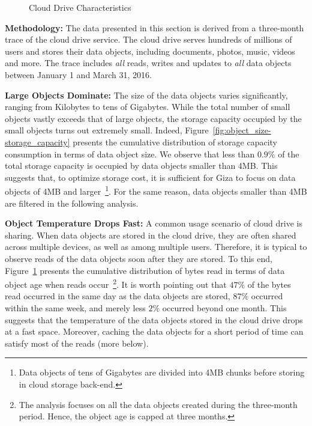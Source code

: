 \begin{figure}[tp]
\begin{subfigure}{.3\textwidth}
  \caption{}
  \label{fig:write_read_gap-bytes_read}
\end{subfigure}%
\caption{Cloud Drive Characteristics}
\label{fig:case_for_giza}
\end{figure}

{\bf Methodology:} The data presented in this section is derived from a three-month trace of the cloud drive service. The cloud drive serves hundreds of millions of users and stores their data objects, including documents, photos, music, videos and more. The trace includes {\em all} reads, writes and updates to {\em all} data objects between January 1 and March 31, 2016.

{\bf Large Objects Dominate:} The size of the data objects varies significantly, ranging from Kilobytes to tens of Gigabytes. While the total number of small objects vastly exceeds that of large objects, the storage capacity occupied by the small objects turns out extremely small. Indeed, Figure~\ref{fig:object_size-storage_capacity} presents the cumulative distribution of storage capacity consumption in terms of data object size. We observe that less than $0.9\%$ of the total storage capacity is occupied by data objects smaller than 4MB. This suggests that, to optimize storage cost, it is sufficient for Giza to focus on data objects of 4MB and larger~\footnote{Data objects of tens of Gigabytes are divided into 4MB chunks before storing in cloud storage back-end.}. For the same reason, data objects smaller than 4MB are filtered in the following analysis.

{\bf Object Temperature Drops Fast:} A common usage scenario of cloud drive is sharing. When data objects are stored in the cloud drive, they are often shared across multiple devices, as well as among multiple users. Therefore, it is typical to observe reads of the data objects soon after they are stored. To this end, Figure~\ref{fig:write_read_gap-bytes_read} presents the cumulative distribution of bytes read in terms of data object age when reads occur~\footnote{The analysis focuses on all the data objects created during the three-month period. Hence, the object age is capped at three months.}. It is worth pointing out that $47\%$ of the bytes read occurred in the same day as the data objects are stored, $87\%$ occurred within the same week, and merely less $2\%$ occurred beyond one month. This suggests that the temperature of the data objects stored in the cloud drive drops at a fast space. Moreover, caching the data objects for a short period of time can satisfy most of the reads (more below).

